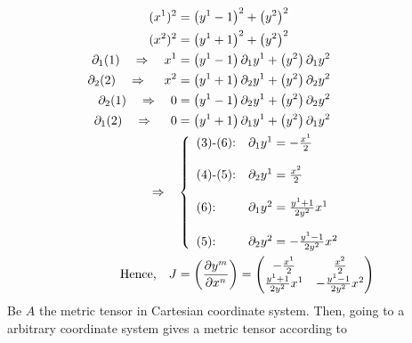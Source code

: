 \begin{align}
\ (x^1)^2 &= \left( y^1-1\right) ^2 + \left(y^2\right)^2\\
\ (x^2)^2 &= \left( y^1+1\right) ^2 + \left(y^2\right)^2\\
\partial_1 (1) \quad\Rightarrow \quad x^1 &= \left( y^1-1\right)\partial_1 y^1  + \left(y^2\right)\partial_1 y^2\\
\partial_2 (2) \quad\Rightarrow \quad\ x^2 &= \left( y^1+1\right)\partial_2 y^1  + \left(y^2\right)\partial_2 y^2\\
\partial_2 (1) \quad\Rightarrow \quad 0 &= \left( y^1-1\right)\partial_2 y^1  + \left(y^2\right)\partial_2 y^2\\
\partial_1 (2) \quad\Rightarrow \quad\ 0 &= \left( y^1+1\right)\partial_1 y^1  + \left(y^2\right)\partial_1 y^2\\
\Rightarrow \quad & \left\{\begin{array}{ll}
\text{(3)-(6):}& \partial_1 y^1 = -\frac{x^1}{2}\\\\
\text{(4)-(5):}& \partial_2 y^1 = \frac{x^2}{2}\\\\
\text{(6):}& \partial_1 y^2 = \frac{y^1+1}{2y^2}x^1\\\\
\text{(5):}& \partial_2 y^2 = -\frac{y^1-1}{2y^2}x^2\\
\end{array}\right.\\
\text{Hence,}\quad J &= \left(\pdv{y^m}{x^n} \right) = \begin{pmatrix}
-\frac{x^1}{2} &\frac{x^2}{2}  \\
\frac{y^1+1}{2y^2}x^1 & -\frac{y^1-1}{2y^2}x^2 \\
\end{pmatrix}
\end{align}
\newpage
Be $A$ the metric tensor in Cartesian coordinate system. Then, going to a arbitrary coordinate system gives a metric tensor according to  
